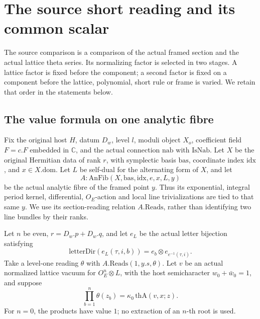 \section{The source short reading and its common scalar}
\label{sec:sr-source-short-reading-normalization}

The source comparison is a comparison of the actual framed
section and the actual lattice theta series.  Its normalizing
factor is selected in two stages.  A lattice factor is fixed
before the component; a second factor is fixed on a component
before the lattice, polynomial, short rule or frame is varied.
We retain that order in the statements below.

\subsection{The value formula on one analytic fibre}
Fix the original host \(H\), datum \(D_w\), level \(l\),
moduli object \(X_o\), coefficient field \(F=c.F\) embedded
in \(\mathbb C\), and the actual connection \(\mathrm{nab}\)
with \(\mathrm{IsNab}\).
Let \(X\) be the original Hermitian data of rank \(r\),
with symplectic basis \(\mathrm{bas}\), coordinate index
\(\mathrm{idx}\), and \(x\in X.\mathrm{dom}\).
Let \(L\) be self-dual for the alternating form of \(X\),
and let
\[
 A:\mathrm{AnFib}(X,\mathrm{bas},\mathrm{idx},e,x,L,y)
\]
be the actual analytic fibre of the framed point \(y\).
Thus its exponential, integral period kernel, differential,
\(O_E\)-action and local line trivializations are tied to
that same \(y\).  We use its section-reading relation
\(A.\mathrm{Reads}\), rather than identifying two line bundles
by their ranks.

Let \(n\) be even, \(r=D_w.p+D_w.q\), and let \(e_L\) be
the actual letter bijection satisfying
\[
 \mathrm{letterDir}(e_L(\tau,i,b))
        =e_b\otimes e_{e^{-1}(\tau,i)} .
 \tag{RS1}\label{eq:sr-source-reading-directions}
\]
Take a level-one reading \(\theta\) with
\(A.\mathrm{Reads}(1,y.s,\theta)\).
Let \(v\) be an actual normalized lattice vacuum for
\(O_E^n\otimes L\), with the host semicharacter
\(w_0+\bar w_0=1\), and suppose
\[
       \prod_{b=1}^{n}\theta(z_b)
            =\kappa_0\,\mathrm{thA}(v,x;z).
 \tag{RS2}\label{eq:sr-source-level-one-product-reading}
\]
For \(n=0\), the products have value \(1\); no extraction
of an \(n\)-th root is used.

